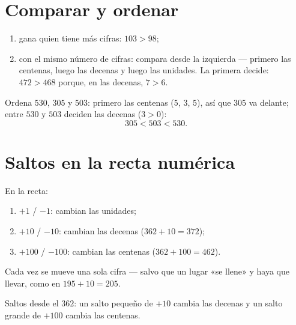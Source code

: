 \section{Comparar y ordenar}

\begin{method}\label{met:g2:numbers:compare}
\begin{enumerate}
  \item gana quien tiene más cifras: $103 > 98$;
  \item con el mismo número de cifras: compara desde la izquierda --- primero las
        centenas, luego las decenas y luego las unidades. La primera  decide:
        $472 > 468$ porque, en las decenas, $7 > 6$.
\end{enumerate}
\end{method}

\begin{example}\label{ex:g2:numbers:order}
Ordena $530$, $305$ y $503$: primero las centenas ($5$, $3$, $5$), así que
$305$ va delante; entre $530$ y $503$ deciden las decenas ($3 > 0$):
\[
305 < 503 < 530 .
\]
\end{example}

\section{Saltos en la recta numérica}

\begin{method}\label{met:g2:numbers:jumps}
En la recta:
\begin{enumerate}
  \item $+1$ / $-1$: cambian las unidades;
  \item $+10$ / $-10$: cambian las decenas ($362 + 10 = 372$);
  \item $+100$ / $-100$: cambian las centenas ($362 + 100 = 462$).
\end{enumerate}
Cada vez se mueve una sola cifra --- salvo que un lugar «se llene» y
haya que llevar, como en $195 + 10 = 205$.
\end{method}

\begin{omfigure}

{\small Saltos desde el $362$: un salto pequeño de $+10$ cambia las decenas y un
salto grande de $+100$ cambia las centenas.}
\end{omfigure}


